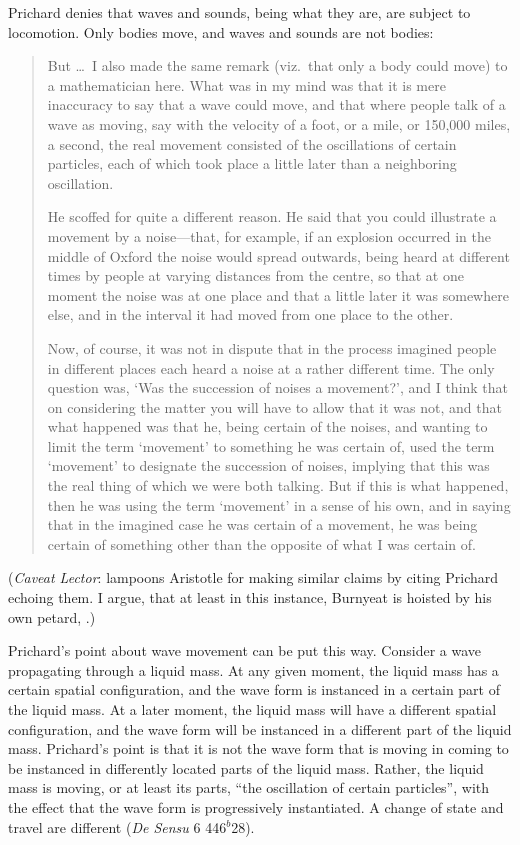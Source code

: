Prichard denies that waves and sounds, being what they are, are subject to locomotion. Only bodies move, and waves and sounds are not bodies:
\begin{quotation}
	But \dots\ I also made the same remark (viz.\ that only a body could move) to a mathematician here. What was in my mind was that it is mere inaccuracy to say that a wave could move, and that where people talk of a wave as moving, say with the velocity of a foot, or a mile, or 150,000 miles, a second, the real movement consisted of the oscillations of certain particles, each of which took place a little later than a neighboring oscillation.
	
	He scoffed for quite a different reason. He said that you could illustrate a movement by a noise---that, for example, if an explosion occurred in the middle of Oxford the noise would spread outwards, being heard at different times by people at varying distances from the centre, so that at one moment the noise was at one place and that a little later it was somewhere else, and in the interval it had moved from one place to the other.
	
	Now, of course, it was not in dispute that in the process imagined people in different places each heard a noise at a rather different time. The only question was, `Was the succession of noises a movement?', and I think that on considering the matter you will have to allow that it was not, and that what happened was that he, being certain of the noises, and wanting to limit the term `movement' to something he was certain of, used the term `movement' to designate the succession of noises, implying that this was the real thing of which we were both talking. But if this is what happened, then he was using the term `movement' in a sense of his own, and in saying that in the imagined case he was certain of a movement, he was being certain of something other than the opposite of what I was certain of. \citep[99]{Prichard:1950kx}
\end{quotation}
(\emph{Caveat Lector}: \citealt[430 n. 29, appendix,]{Burnyeat:1995fk} lampoons Aristotle for making similar claims by citing Prichard echoing them. I argue, that at least in this instance, Burnyeat is hoisted by his own petard, \citealt[chapter 3.2]{Kalderon:2015fr}.)

Prichard's point about wave movement can be put this way. Consider a wave propagating through a liquid mass. At any given moment, the liquid mass has a certain spatial configuration, and the wave form is instanced in a certain part of the liquid mass. At a later moment, the liquid mass will have a different spatial configuration, and the wave form will be instanced in a different part of the liquid mass. Prichard's point is that it is not the wave form that is moving in coming to be instanced in differently located parts of the liquid mass. Rather, the liquid mass is moving, or at least its parts, ``the oscillation of certain particles'', with the effect that the wave form is progressively instantiated. A change of state and travel are different (\emph{De Sensu} 6 446\( ^{b} \)28).

